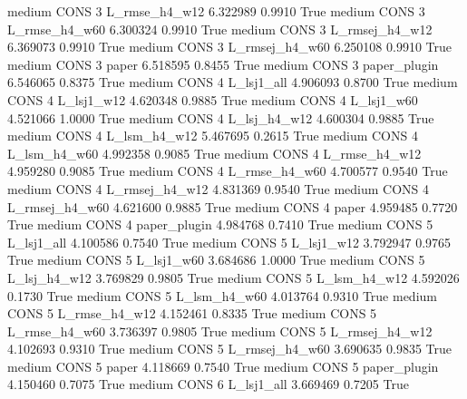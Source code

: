     medium     CONS                 3  L_rmse_h4_w12   6.322989      0.9910    True
    medium     CONS                 3  L_rmse_h4_w60   6.300324      0.9910    True
    medium     CONS                 3 L_rmsej_h4_w12   6.369073      0.9910    True
    medium     CONS                 3 L_rmsej_h4_w60   6.250108      0.9910    True
    medium     CONS                 3          paper   6.518595      0.8455    True
    medium     CONS                 3   paper_plugin   6.546065      0.8375    True
    medium     CONS                 4     L_lsj1_all   4.906093      0.8700    True
    medium     CONS                 4     L_lsj1_w12   4.620348      0.9885    True
    medium     CONS                 4     L_lsj1_w60   4.521066      1.0000    True
    medium     CONS                 4   L_lsj_h4_w12   4.600304      0.9885    True
    medium     CONS                 4   L_lsm_h4_w12   5.467695      0.2615    True
    medium     CONS                 4   L_lsm_h4_w60   4.992358      0.9085    True
    medium     CONS                 4  L_rmse_h4_w12   4.959280      0.9085    True
    medium     CONS                 4  L_rmse_h4_w60   4.700577      0.9540    True
    medium     CONS                 4 L_rmsej_h4_w12   4.831369      0.9540    True
    medium     CONS                 4 L_rmsej_h4_w60   4.621600      0.9885    True
    medium     CONS                 4          paper   4.959485      0.7720    True
    medium     CONS                 4   paper_plugin   4.984768      0.7410    True
    medium     CONS                 5     L_lsj1_all   4.100586      0.7540    True
    medium     CONS                 5     L_lsj1_w12   3.792947      0.9765    True
    medium     CONS                 5     L_lsj1_w60   3.684686      1.0000    True
    medium     CONS                 5   L_lsj_h4_w12   3.769829      0.9805    True
    medium     CONS                 5   L_lsm_h4_w12   4.592026      0.1730    True
    medium     CONS                 5   L_lsm_h4_w60   4.013764      0.9310    True
    medium     CONS                 5  L_rmse_h4_w12   4.152461      0.8335    True
    medium     CONS                 5  L_rmse_h4_w60   3.736397      0.9805    True
    medium     CONS                 5 L_rmsej_h4_w12   4.102693      0.9310    True
    medium     CONS                 5 L_rmsej_h4_w60   3.690635      0.9835    True
    medium     CONS                 5          paper   4.118669      0.7540    True
    medium     CONS                 5   paper_plugin   4.150460      0.7075    True
    medium     CONS                 6     L_lsj1_all   3.669469      0.7205    True
